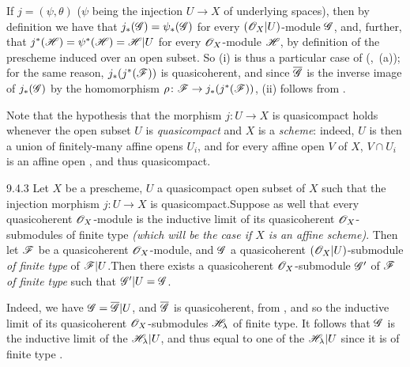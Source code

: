 \documentclass{book}
\begin{document}
If $j=(\psi,\theta)$ ($\psi$ being the injection $U\to X$ of underlying spaces),
then by definition we have that $j_\ast(\mathscr{G})=\psi_\ast(\mathscr{G})$ for every
$(\mathscr{O}_X|U)$-module $\mathscr{G}$, and, further, that
$j^\ast(\mathscr{H})=\psi^\ast(\mathscr{H})=\mathscr{H}|U$ for every $\mathscr{O}_X$-module
$\mathscr{H}$, by definition of the prescheme induced over an open subset. So (i)
is thus a particular case of (,~(a)); for the same reason,
$j_\ast(j^\ast(\mathscr{F}))$ is quasicoherent, and since $\overline{\mathscr{G}}$ is the
inverse image of $j_\ast(\mathscr{G})$ by the homomorphism $\rho\colon\mathscr{F}\to
j_\ast(j^\ast(\mathscr{F}))$, (ii) follows from .
 
Note that the hypothesis that the morphism $j\colon U\to X$ is quasicompact
holds whenever the open subset $U$ is \emph{quasicompact} and $X$ is a
\emph{scheme}: indeed, $U$ is then a union of finitely-many affine opens $U_i$,
and for every affine open $V$ of $X$, $V\cap U_i$ is an affine open , and
thus quasicompact.
 
\begin{envs}[Corollary]{9.4.3}
\label{cor-1.9.4.3}
Let $X$ be a prescheme, $U$ a quasicompact open
subset of $X$ such that the injection morphism $j\colon U\to X$ is
quasicompact.Suppose as well that every quasicoherent $\mathscr{O}_X$-module is the
inductive limit of its quasicoherent $\mathscr{O}_X$-submodules of finite type
\emph{(which will be the case if $X$ is an \emph{affine scheme})}. Then let
$\mathscr{F}$ be a quasicoherent $\mathscr{O}_X$-module, and $\mathscr{G}$ a quasicoherent
$(\mathscr{O}_X|U)$-submodule \emph{of finite type} of $\mathscr{F}|U$.Then there exists
a quasicoherent $\mathscr{O}_X$-submodule $\mathscr{G}'$ of $\mathscr{F}$ \emph{of finite
type} such that $\mathscr{G}'|U=\mathscr{G}$.
\end{envs}
 
Indeed, we have $\mathscr{G}=\overline{\mathscr{G}}|U$, and $\overline{\mathscr{G}}$
is quasicoherent, from , and so the inductive limit of its
quasicoherent $\mathscr{O}_X$-submodules $\mathscr{H}_\lambda$ of finite type. It
follows that $\mathscr{G}$ is the inductive limit of the $\mathscr{H}_\lambda|U$,
and thus equal to one of the $\mathscr{H}_\lambda|U$ since it is of finite type
.
 
\end{document}
